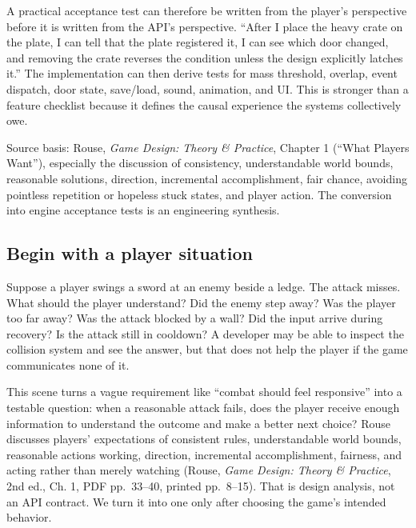 A practical acceptance test can therefore be written from the player's perspective before it is written from the API's perspective. ``After I place the heavy crate on the plate, I can tell that the plate registered it, I can see which door changed, and removing the crate reverses the condition unless the design explicitly latches it.'' The implementation can then derive tests for mass threshold, overlap, event dispatch, door state, save/load, sound, animation, and UI. This is stronger than a feature checklist because it defines the causal experience the systems collectively owe.

Source basis: Rouse, \emph{Game Design: Theory \& Practice}, Chapter 1 (``What Players Want''), especially the discussion of consistency, understandable world bounds, reasonable solutions, direction, incremental accomplishment, fair chance, avoiding pointless repetition or hopeless stuck states, and player action. The conversion into engine acceptance tests is an engineering synthesis.

\subsection{Begin with a player situation}\label{05-engine-i-ch009-begin-with-a-player-situation}

\hypertarget{05-engine-i-ch009-begin-with-a-player-situation}{}

Suppose a player swings a sword at an enemy beside a ledge. The attack misses. What should the player understand? Did the enemy step away? Was the player too far away? Was the attack blocked by a wall? Did the input arrive during recovery? Is the attack still in cooldown? A developer may be able to inspect the collision system and see the answer, but that does not help the player if the game communicates none of it.

This scene turns a vague requirement like ``combat should feel responsive'' into a testable question: when a reasonable attack fails, does the player receive enough information to understand the outcome and make a better next choice? Rouse discusses players' expectations of consistent rules, understandable world bounds, reasonable actions working, direction, incremental accomplishment, fairness, and acting rather than merely watching (Rouse, \emph{Game Design: Theory \& Practice}, 2nd ed., Ch. 1, PDF pp.~33--40, printed pp.~8--15). That is design analysis, not an API contract. We turn it into one only after choosing the game's intended behavior.

